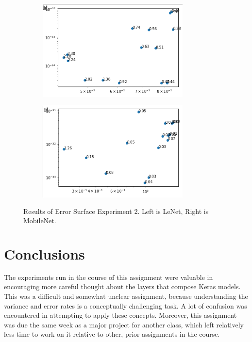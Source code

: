 \documentclass{article}
\begin{document}
\begin{figure}[H]
\centering
\begin{subfigure}
  \centering
  \includegraphics[width=3in]{csci-8920/hw-3/images/lenet_final.png}
  \label{fig:ln-2}
\end{subfigure}%
\begin{subfigure}
  \centering
  \includegraphics[width=3in]{csci-8920/hw-3/images/mobilenet_final.png}
  \label{fig:mn-2}
\end{subfigure}
\caption{Results of Error Surface Experiment 2. Left is LeNet, Right is MobileNet.}
\label{fig:default-15}
\end{figure}

\section{Conclusions}
The experiments run in the course of this assignment were valuable in encouraging more careful thought about the layers that compose Keras models.
This was a difficult and somewhat unclear assignment, because understanding the variance and error rates is a conceptually challenging task.
A lot of confusion was encountered in attempting to apply these concepts.
Moreover, this assignment was due the same week as a major project for another class, which left relatively less time to work on it relative to other, prior assignments in the course.
\end{document}

